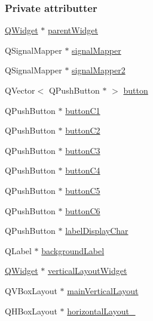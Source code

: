 \subsubsection*{Private attributter}
\begin{DoxyCompactItemize}
\item 
\hyperlink{class_q_widget}{Q\+Widget} $\ast$ \hyperlink{class_q_virtual_keyboard_ad9c9372b637d19e1d7e35c44eef6e3e7}{parent\+Widget}
\item 
Q\+Signal\+Mapper $\ast$ \hyperlink{class_q_virtual_keyboard_aaa72fcbe4b8eac04110e709e5876436b}{signal\+Mapper}
\item 
Q\+Signal\+Mapper $\ast$ \hyperlink{class_q_virtual_keyboard_a4696f23cc6529fba639a8f52679ba8dd}{signal\+Mapper2}
\item 
Q\+Vector$<$ Q\+Push\+Button $\ast$ $>$ \hyperlink{class_q_virtual_keyboard_aceb8c4f9d7381faae49bbc8638e4f286}{button}
\item 
Q\+Push\+Button $\ast$ \hyperlink{class_q_virtual_keyboard_abede25384f9be8870ef541a31a27ccfc}{button\+C1}
\item 
Q\+Push\+Button $\ast$ \hyperlink{class_q_virtual_keyboard_a7f0959a9c59da7940cc052ea51626c5f}{button\+C2}
\item 
Q\+Push\+Button $\ast$ \hyperlink{class_q_virtual_keyboard_ab33b8e12f4e396eed1b96cb46dc890fb}{button\+C3}
\item 
Q\+Push\+Button $\ast$ \hyperlink{class_q_virtual_keyboard_a25f42c686bab18c2fbe87cf1f49dcde5}{button\+C4}
\item 
Q\+Push\+Button $\ast$ \hyperlink{class_q_virtual_keyboard_a7221321ae78fe3e486e098a1e44f34b0}{button\+C5}
\item 
Q\+Push\+Button $\ast$ \hyperlink{class_q_virtual_keyboard_ac332f23e9b221714f422087d2d87d9b6}{button\+C6}
\item 
Q\+Push\+Button $\ast$ \hyperlink{class_q_virtual_keyboard_a2230006aad7be0bfd701328870f4dcee}{label\+Display\+Char}
\item 
Q\+Label $\ast$ \hyperlink{class_q_virtual_keyboard_a2eb3cbd95ab4f4c8930d6e5174eba3af}{background\+Label}
\item 
\hyperlink{class_q_widget}{Q\+Widget} $\ast$ \hyperlink{class_q_virtual_keyboard_a4dab2ee47678bbea22fe10267a009293}{vertical\+Layout\+Widget}
\item 
Q\+V\+Box\+Layout $\ast$ \hyperlink{class_q_virtual_keyboard_aad608b448bdf0d3b90753859aab1f21b}{main\+Vertical\+Layout}
\item 
Q\+H\+Box\+Layout $\ast$ \hyperlink{class_q_virtual_keyboard_a33382d1f071315a4549f47f72121956a}{horizontal\+Layout\+\_}

\end{DoxyCompactItemize}
